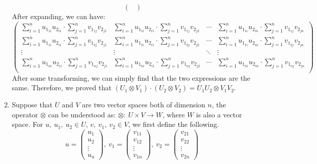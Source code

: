 \documentclass[12pt, a4paper]{article}
\begin{document}
\begin{enumerate}
$$\begin{pmatrix}
          \end{pmatrix}
          $$
          After expanding, we can have:
          $$
          \begin{pmatrix}
            \sum_{i=1}^n u_{1_{1i}}u_{2_{i1}}\cdot \sum_{j=1}^n v_{1_{1j}}v_{2_{j1}} & \sum_{i=1}^n u_{1_{1i}}u_{2_{i1}}\cdot\sum_{j=1}^n v_{1_{1j}}v_{2_{j2}} & \cdots & \sum_{i=1}^n u_{1_{1i}}u_{2_{in}}\cdot \sum_{j=1}^n v_{1_{1j}}v_{2_{jn}}\\
            \sum_{i=1}^n u_{1_{1i}}u_{2_{i1}}\cdot \sum_{j=1}^n v_{1_{2j}}v_{2_{j1}} & \sum_{i=1}^n u_{1_{1i}}u_{2_{i1}}\cdot\sum_{j=1}^n v_{1_{2j}}v_{2_{j2}} & \cdots & \sum_{i=1}^n u_{1_{1i}}u_{2_{in}}\cdot \sum_{j=1}^n v_{1_{2j}}v_{2_{jn}}\\
            \vdots & \vdots & \ddots & \vdots\\
            \sum_{i=1}^n u_{1_{ni}}u_{2_{i1}}\cdot \sum_{j=1}^n v_{1_{nj}}v_{2_{j1}} & \sum_{i=1}^n u_{1_{ni}}u_{2_{i1}}\cdot\sum_{j=1}^n v_{1_{nj}}v_{2_{j2}} & \cdots & \sum_{i=1}^n u_{1_{ni}}u_{2_{in}}\cdot \sum_{j=1}^n v_{1_{nj}}v_{2_{jn}}\\
          \end{pmatrix}
          $$
          After some transforming, we can simply find that the two expressions are the same. 
          Therefore, we proved that $(U_1\otimes V_1)\cdot(U_2\otimes V_2) = U_1U_2 \otimes V_1V_2$.
    \item Suppose that $U$ and $V$ are two vector spaces both of dimension $n$, the operator $\otimes$ can be understood as: 
          $\otimes:\ U\times V\rightarrow W$, where $W$ is also a vector space. For $u,\ u_1,\ u_2\in U$, $v,\ v_1,\ v_2\in V$, 
          we first define the following. 
          $$
          u = \begin{pmatrix} u_1\\ u_2\\ \vdots \\ u_n \end{pmatrix},\ 
          v_1 = \begin{pmatrix} v_{11}\\ v_{12}\\ \vdots \\ v_{1n} \end{pmatrix},\ 
          v_2 = \begin{pmatrix} v_{21}\\ v_{22}\\ \vdots \\ v_{2n} \end{pmatrix}\, 
$$
\end{enumerate}
\end{document}
